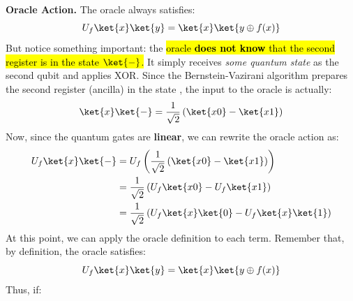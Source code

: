 \highspace
\textcolor{Green3}{ \textbf{Oracle Action.}} The oracle always satisfies:
\begin{equation*}
    U_f\ket{x}\ket{y} = \ket{x}\ket{y \oplus f(x)}
\end{equation*}
But notice something important: the \hl{oracle \textbf{does not know} that the second register is in the state $\ket{-}$.} It simply receives \emph{some quantum state} as the second qubit and applies XOR. Since the Bernstein-Vazirani algorithm prepares the second register (ancilla) in the state \ket{-}, the input to the oracle is actually:
\begin{align*}
    \ket{x}\ket{-} = \frac{1}{\sqrt{2}}\left(\ket{x0} - \ket{x1}\right)
\end{align*}
Now, since the quantum gates are \textbf{linear}, we can rewrite the oracle action as:
\begin{align*}
    U_f\ket{x}\ket{-} &= U_f \left(\frac{1}{\sqrt{2}}\left(\ket{x0} - \ket{x1}\right)\right) \\
    &= \frac{1}{\sqrt{2}} \left(
        U_f\ket{x0} - U_f\ket{x1}
    \right) \\
    &= \frac{1}{\sqrt{2}} \left(
        U_f\ket{x}\ket{0} - U_f\ket{x}\ket{1}
    \right)
\end{align*}
At this point, we can apply the oracle definition to each term. Remember that, by definition, the oracle satisfies:
\begin{equation*}
    U_f\ket{x}\ket{y} = \ket{x}\ket{y \oplus f(x)}
\end{equation*}
Thus, if:
